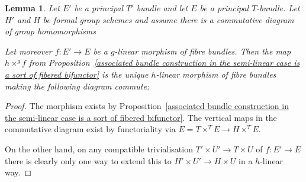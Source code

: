 \documentclass[10pt,oneside]{amsart}
\newtheorem{lemma}[theorem]{Lemma}
\theoremstyle{definition}
\begin{document}
	\begin{lemma}\label{universal property of associated fibre construction in the semilinear case}
		Let $E'$ be a principal $T'$ bundle and let $E$ be a principal $T$-bundle. Let $H'$ and $H$ be formal group schemes and assume there is a commutative diagram of group homomorphisms
		\begin{center}
		\end{center}
		Let moreover $f:E'\rightarrow E$ be a $g$-linear morphism of fibre bundles.
		Then the map $h\times^g f$ from Proposition~\ref{associated bundle construction in the semi-linear case is a sort of fibered bifunctor} is the unique $h$-linear morphism of fibre bundles making the following diagram commute:
		\begin{center}
		\end{center}
	\end{lemma}
	\begin{proof}
		The morphism exists by Proposition~\ref{associated bundle construction in the semi-linear case is a sort of fibered bifunctor}. The vertical maps in the commutative diagram exist by functoriality via $E=T\times^{T}E\rightarrow H\times^{T}E$. 
		
		On the other hand, on any compatible trivialisation $T'\times U'\rightarrow T\times U$ of $f:E'\rightarrow E$ there is clearly only one way to extend this to $H'\times U'\rightarrow H\times U$ in a $h$-linear way.
	\end{proof}
	
\end{document}
